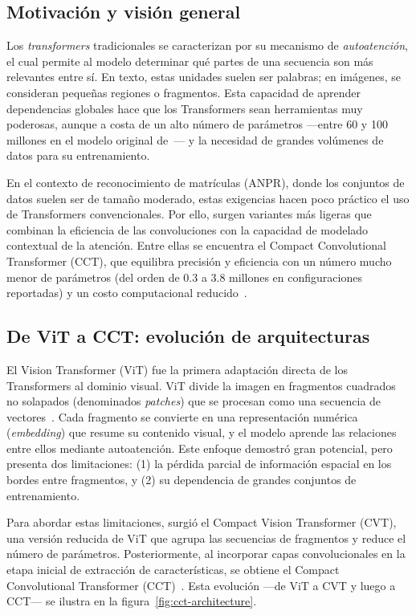 \subsection{Motivación y visión general}

Los \emph{transformers} tradicionales se caracterizan por su mecanismo de \emph{autoatención}, 
el cual permite al modelo determinar qué partes de una secuencia son más relevantes entre sí. 
En texto, estas unidades suelen ser palabras; en imágenes, se consideran pequeñas regiones o fragmentos.  
Esta capacidad de aprender dependencias globales hace que los Transformers sean herramientas muy poderosas, 
aunque a costa de un alto número de parámetros —entre 60 y 100 millones en el modelo original 
de~\cite{vaswani2023attentionneed}--- y la necesidad de grandes volúmenes de datos para su entrenamiento.

En el contexto de reconocimiento de matrículas (ANPR), donde los conjuntos de datos suelen ser 
de tamaño moderado, estas exigencias hacen poco práctico el uso de Transformers convencionales.  
Por ello, surgen variantes más ligeras que combinan la eficiencia de las convoluciones con 
la capacidad de modelado contextual de la atención. Entre ellas se encuentra el 
Compact Convolutional Transformer (CCT), que equilibra precisión y eficiencia 
con un número mucho menor de parámetros (del orden de 0.3 a 3.8 millones en configuraciones reportadas) 
y un costo computacional reducido~\cite{hassani2021escaping}.

\subsection{De ViT a CCT: evolución de arquitecturas}

El Vision Transformer (ViT) fue la primera adaptación directa de los Transformers al dominio visual.  
ViT divide la imagen en fragmentos cuadrados no solapados (denominados \emph{patches}) que se procesan 
como una secuencia de vectores~\cite{dosovitskiy2021imageworth16x16words}.
Cada fragmento se convierte en una representación numérica (\emph{embedding}) que resume su contenido visual, 
y el modelo aprende las relaciones entre ellos mediante autoatención.  
Este enfoque demostró gran potencial, pero presenta dos limitaciones: 
(1) la pérdida parcial de información espacial en los bordes entre fragmentos, 
y (2) su dependencia de grandes conjuntos de entrenamiento.

Para abordar estas limitaciones, surgió el Compact Vision Transformer (CVT), 
una versión reducida de ViT que agrupa las secuencias de fragmentos y reduce el número de parámetros.  
Posteriormente, al incorporar capas convolucionales en la etapa inicial de extracción de características, 
se obtiene el Compact Convolutional Transformer (CCT)~\cite{hassani2021escaping}.  
Esta evolución ---de ViT a CVT y luego a CCT--- se ilustra en la figura~\ref{fig:cct-architecture}.

